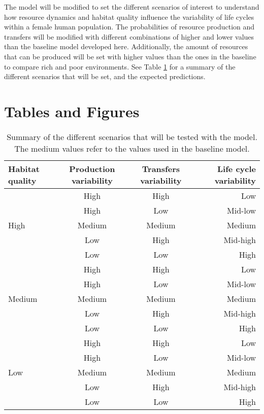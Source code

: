 \documentclass{article}
\begin{document}
The model will be modified to set the different scenarios of interest to understand how resource dynamics and habitat quality influence the variability of life cycles within a female human population. The probabilities of resource production and transfers will be modified with different combinations of higher and lower values than the baseline model developed here. Additionally, the amount of resources that can be produced will be set with higher values than the ones in the baseline to compare rich and poor environments. See Table \ref{tab:1} for a summary of the different scenarios that will be set, and the expected predictions.

\section{Tables and Figures}

\begin{table}[H]
    \centering
    \caption{Summary of the different scenarios that will be tested with the model. The medium values refer to the values used in the baseline model.}
    \begin{tabular}{lccr}
    \hline
    Habitat quality & Production variability & Transfers variability & Life cycle variability\\ 
    \hline
    \multirow{5}{*}{High}  & High & High & Low \\
     & High & Low & Mid-low \\
     & Medium & Medium & Medium \\
     & Low & High & Mid-high \\
     & Low & Low & High \\
     \hline
    \multirow{5}{*}{Medium} & High & High & Low \\
     & High & Low & Mid-low \\
     & Medium & Medium & Medium \\
     & Low & High & Mid-high \\
     & Low & Low & High \\
     \hline
    \multirow{5}{*}{Low} & High & High & Low \\
     & High & Low & Mid-low \\
     & Medium & Medium & Medium \\
     & Low & High & Mid-high \\
     & Low & Low & High \\
    \hline
    \end{tabular}
    \label{tab:1}
\end{table}
\end{document}
